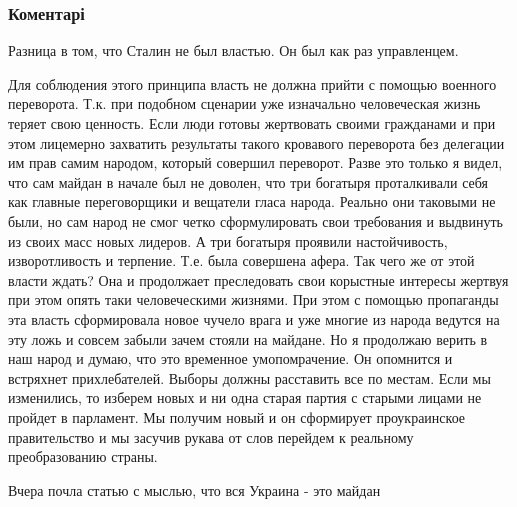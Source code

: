  
 
 
 
 
\subsubsection{Коментарі}
\label{sec:31_08_2014.fb.zharkih_denis.1.principy_dlja_nashego_kluba.cmt}

\begin{itemize} %

Разница в том, что Сталин не был властью. Он был как раз управленцем.


Для соблюдения этого принципа власть не должна прийти с помощью военного
переворота. Т.к. при подобном сценарии уже изначально человеческая жизнь теряет
свою ценность. Если люди готовы жертвовать своими гражданами и при этом
лицемерно захватить результаты такого кровавого переворота без делегации им
прав самим народом, который совершил переворот. Разве это только я видел, что
сам майдан в начале был не доволен, что три богатыря проталкивали себя как
главные переговорщики и вещатели гласа народа. Реально они таковыми не были, но
сам народ не смог четко сформулировать свои требования и выдвинуть из своих
масс новых лидеров. А три богатыря проявили настойчивость, изворотливость и
терпение. Т.е. была совершена афера. Так чего же от этой власти ждать? Она и
продолжает преследовать свои корыстные интересы жертвуя при этом опять таки
человеческими жизнями. При этом с помощью пропаганды эта власть сформировала
новое чучело врага и уже многие из народа ведутся на эту ложь и совсем забыли
зачем стояли на майдане. Но я продолжаю верить в наш народ и думаю, что это
временное умопомрачение. Он опомнится и встряхнет прихлебателей. Выборы должны
расставить все по местам. Если мы изменились, то изберем новых и ни одна старая
партия с старыми лицами не пройдет в парламент. Мы получим новый и он
сформирует проукраинское правительство и мы засучив рукава от слов перейдем к
реальному преобразованию страны.


Вчера почла статью с мыслью, что вся Украина - это майдан


\end{itemize}
